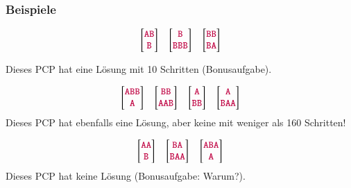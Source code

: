 \documentclass[aspectratio=1610,onlymath]{beamer}
\begin{document}
\begin{frame}\frametitle{Beispiele}

 \[
\left[\begin{matrix}\mathtt{\textcolor{purple}{AB}}\\\mathtt{\textcolor{purple}{B}}\end{matrix}\right]\quad
\left[\begin{matrix}\mathtt{\textcolor{purple}{B}}\\\mathtt{\textcolor{purple}{BBB}}\end{matrix}\right]\quad
\left[\begin{matrix}\mathtt{\textcolor{purple}{BB}}\\\mathtt{\textcolor{purple}{BA}}\end{matrix}\right]
 \]

 \pause Dieses PCP hat eine Lösung mit 10 Schritten (Bonusaufgabe).\pause

\bigskip
\[
\left[\begin{matrix}\mathtt{\textcolor{purple}{ABB}}\\\mathtt{\textcolor{purple}{A}}\end{matrix}\right]\quad
\left[\begin{matrix}\mathtt{\textcolor{purple}{BB}}\\\mathtt{\textcolor{purple}{AAB}}\end{matrix}\right]\quad
\left[\begin{matrix}\mathtt{\textcolor{purple}{A}}\\\mathtt{\textcolor{purple}{BB}}\end{matrix}\right]\quad
\left[\begin{matrix}\mathtt{\textcolor{purple}{A}}\\\mathtt{\textcolor{purple}{BAA}}\end{matrix}\right]
 \] 
\pause Dieses PCP hat ebenfalls eine Lösung, aber keine mit weniger als 160 Schritten!\pause

\bigskip
\[
\left[\begin{matrix}\mathtt{\textcolor{purple}{AA}}\\\mathtt{\textcolor{purple}{B}}\end{matrix}\right]\quad
\left[\begin{matrix}\mathtt{\textcolor{purple}{BA}}\\\mathtt{\textcolor{purple}{BAA}}\end{matrix}\right]\quad
\left[\begin{matrix}\mathtt{\textcolor{purple}{ABA}}\\\mathtt{\textcolor{purple}{A}}\end{matrix}\right]
 \]
\pause Dieses PCP hat keine Lösung (Bonusaufgabe: Warum?).

\end{frame}
\end{document}
